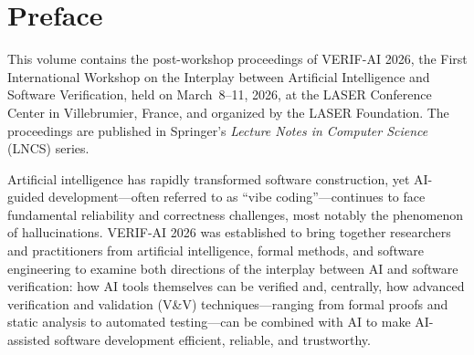 %
%
%
%
%
%
%

\chapter*{Preface}

This volume contains the post-workshop proceedings of VERIF-AI 2026, the First
International Workshop on the Interplay between Artificial Intelligence and
Software Verification, held on March~8--11, 2026, at the LASER Conference
Center in Villebrumier, France, and organized by the LASER Foundation. The
proceedings are published in Springer's \emph{Lecture Notes in Computer
Science} (LNCS) series.

Artificial intelligence has rapidly transformed software construction, yet
AI-guided development---often referred to as ``vibe coding''---continues to
face fundamental reliability and correctness challenges, most notably the
phenomenon of hallucinations. VERIF-AI 2026 was established to bring together
researchers and practitioners from artificial intelligence, formal methods, and
software engineering to examine both directions of the interplay between AI and
software verification: how AI tools themselves can be verified and, centrally,
how advanced verification and validation (V\&V) techniques---ranging from
formal proofs and static analysis to automated testing---can be combined with
AI to make AI-assisted software development efficient, reliable, and
trustworthy.


